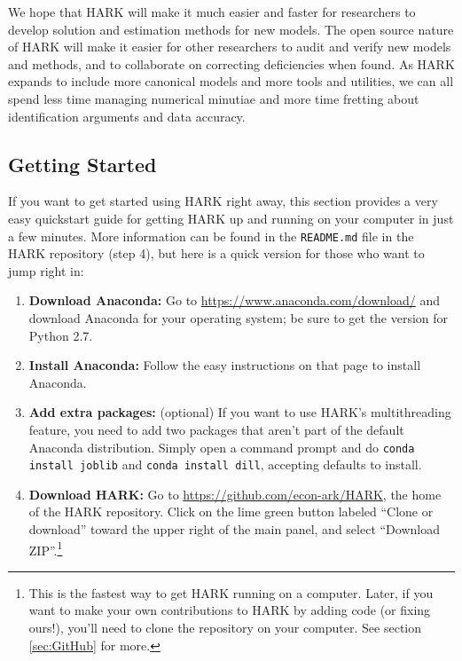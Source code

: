 \documentclass[12pt,titlepage,letterpaper]{econtex}
\begin{document}
{We hope that HARK will make it much easier and faster for researchers to develop solution and estimation methods for new models.  The open source nature of HARK will make it easier for other researchers to audit and verify new models and methods, and to collaborate on correcting deficiencies when found.  As HARK expands to include more canonical models and more tools and utilities, we can all spend less time managing numerical minutiae and more time fretting about identification arguments and data accuracy.

\subsection{Getting Started}\label{sec:GettingStarted}

If you want to get started using HARK right away, this section provides a very easy quickstart guide for getting HARK up and running on your computer in just a few minutes.  More information can be found in the \texttt{README.md} file in the HARK repository (step 4), but here is a quick version for those who want to jump right in:

\begin{enumerate}
\item \textbf{Download Anaconda:} Go to \href{https://www.anaconda.com/download/}{https://www.anaconda.com/download/} and download Anaconda for your operating system; be sure to get the version for Python 2.7.

\item \textbf{Install Anaconda:} Follow the easy instructions on that page to install Anaconda.

\item \textbf{Add extra packages:} (optional) If you want to use HARK's multithreading feature, you need to add two packages that aren't part of the default Anaconda distribution.  Simply open a command prompt and do \texttt{conda install joblib} and \texttt{conda install dill}, accepting defaults to install.

\item \textbf{Download HARK:} Go to \href{https://github.com/econ-ark/HARK}{https://github.com/econ-ark/HARK}, the home of the HARK repository.  Click on the lime green button labeled ``Clone or download'' toward the upper right of the main panel, and select ``Download ZIP''.\footnote{This is the fastest way to get HARK running on a computer.  Later, if you want to make your own contributions to HARK by adding code (or fixing ours!), you'll need to clone the repository on your computer.  See section \ref{sec:GitHub} for more.}


\end{enumerate}}
\end{document}
